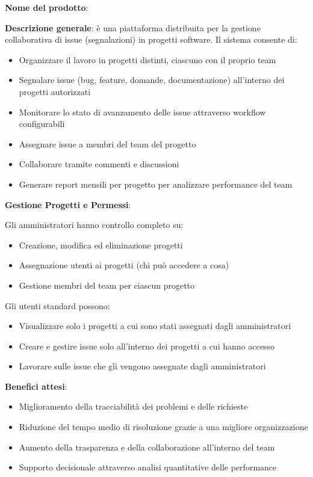 \noindent\textbf{Nome del prodotto}: \productname

\noindent\textbf{Descrizione generale}: \productname{} è una piattaforma distribuita per la gestione collaborativa di issue (segnalazioni) in progetti software. Il sistema consente di:

\begin{itemize}[leftmargin=1.1em]
\item Organizzare il lavoro in progetti distinti, ciascuno con il proprio team
\item Segnalare issue (bug, feature, domande, documentazione) all'interno dei progetti autorizzati
\item Monitorare lo stato di avanzamento delle issue attraverso workflow configurabili
\item Assegnare issue a membri del team del progetto
\item Collaborare tramite commenti e discussioni
\item Generare report mensili per progetto per analizzare performance del team
\end{itemize}

\noindent\textbf{Gestione Progetti e Permessi}:

Gli amministratori hanno controllo completo su:
\begin{itemize}[leftmargin=1.1em]
\item Creazione, modifica ed eliminazione progetti
\item Assegnazione utenti ai progetti (chi può accedere a cosa)
\item Gestione membri del team per ciascun progetto
\end{itemize}

Gli utenti standard possono:
\begin{itemize}[leftmargin=1.1em]
\item Visualizzare solo i progetti a cui sono stati assegnati dagli amministratori
\item Creare e gestire issue solo all'interno dei progetti a cui hanno accesso
\item Lavorare sulle issue che gli vengono assegnate dagli amministratori
\end{itemize}

\noindent\textbf{Benefici attesi}:

\begin{itemize}[leftmargin=1.1em]
\item Miglioramento della tracciabilità dei problemi e delle richieste
\item Riduzione del tempo medio di risoluzione grazie a una migliore organizzazione
\item Aumento della trasparenza e della collaborazione all'interno del team
\item Supporto decisionale attraverso analisi quantitative delle performance
\end{itemize}


